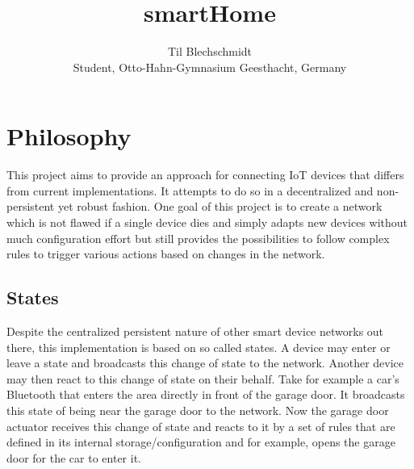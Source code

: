 \documentclass[a4paper]{article}
\title{}
\author{}
\title{smartHome}
\author{Til Blechschmidt\\ Student, Otto-Hahn-Gymnasium Geesthacht, Germany}
\begin{document}
	\maketitle
	\newpage
	
	\tableofcontents
	\listoffigures
	\listoftables
	\newpage
	
	

    \section{Philosophy}
        This project aims to provide an approach for connecting IoT devices that differs from current implementations.
        It attempts to do so in a decentralized and non-persistent yet robust fashion. One goal of this project is to
        create a network which is not flawed if a single device dies and simply adapts new devices without much
        configuration effort but still provides the possibilities to follow complex rules to trigger various actions
        based on changes in the network.
        \subsection{States}
	        Despite the centralized persistent nature of other smart device networks out there, this
	        implementation is based on so called states. A device may enter or leave a state and broadcasts this change
	        of state to the network. Another device may then react to this change of state on their behalf. Take for example a car's Bluetooth that enters the area
	        directly in front of the garage door. It broadcasts this state of being near the garage door to the
	        network. Now the garage door actuator receives this change of state and reacts to it by a set of rules that
	        are defined in its internal storage/configuration and for example, opens the garage door for the car
	        to enter it.\\
\end{document}
